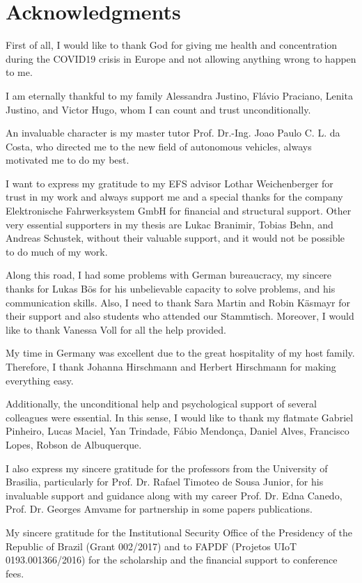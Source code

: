 \section*{Acknowledgments}
First of all, I would like to thank God for giving me health and concentration during the COVID19 crisis in Europe and not allowing anything wrong to happen to me. 

I am eternally thankful to my family Alessandra Justino, Flávio Praciano, Lenita Justino, and Victor Hugo, whom I can count and trust unconditionally.

An invaluable character is my master tutor Prof. Dr.-Ing. Joao Paulo C. L. da Costa, who directed me to the new field of autonomous vehicles, always motivated me to do my best.

I want to express my gratitude to my EFS advisor Lothar Weichenberger for trust in my work and always support me and a special thanks for the company Elektronische Fahrwerksystem GmbH for financial and structural support. Other very essential supporters in my thesis are Lukac Branimir, Tobias Behn, and Andreas Schustek, without their valuable support, and it would not be possible to do much of my work.

Along this road, I had some problems with German bureaucracy, my sincere thanks for Lukas Bös for his unbelievable capacity to solve problems, and his communication skills. Also, I need to thank Sara Martin and Robin Käsmayr for their support and also students who attended our Stammtisch. Moreover, I would like to thank Vanessa Voll for all the help provided.

My time in Germany was excellent due to the great hospitality of my host family. Therefore, I thank Johanna Hirschmann and Herbert Hirschmann for making everything easy.

Additionally, the unconditional help and psychological support of several colleagues were essential. In this sense, I would like to thank my flatmate Gabriel Pinheiro, Lucas Maciel, Yan Trindade, Fábio Mendonça, Daniel Alves, Francisco Lopes, Robson de Albuquerque.

I also express my sincere gratitude for the professors from the University of Brasilia, particularly for Prof. Dr. Rafael Timoteo de Sousa Junior, for his invaluable support and guidance along with my career Prof. Dr. Edna Canedo, Prof. Dr. Georges Amvame for partnership in some papers publications.

My sincere gratitude for the Institutional Security Office of the Presidency of the Republic of Brazil (Grant 002/2017) and to FAPDF (Projetos UIoT 0193.001366/2016) for the scholarship and the financial support to conference fees.


